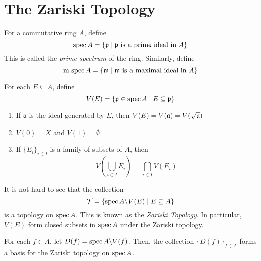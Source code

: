 \section{The Zariski Topology}

\begin{definition}
    For a commutative ring $A$, define 
    \begin{equation*}
        \operatorname{spec} A = \{\mathfrak p\mid\mathfrak p\text{ is a prime ideal in }A\}
    \end{equation*}
    This is called the \textit{prime spectrum} of the ring. Similarly, define 
    \begin{equation*}
        \operatorname{m-spec} A = \{\mathfrak m\mid\mathfrak m\text{ is a maximal ideal in } A\}
    \end{equation*}
\end{definition}

For each $E\subseteq A$, define 
\begin{equation*}
    V(E) = \{\mathfrak p\in\operatorname{spec} A\mid E\subseteq\mathfrak p\}
\end{equation*}

\begin{proposition}
\begin{enumerate}[label=(\alph*)]
    \item If $\mathfrak a$ is the ideal generated by $E$, then $V(E) = V(\mathfrak a) = V(\sqrt{\mathfrak a})$
    \item $V(0) = X$ and $V(1) = \emptyset$ 
    \item If $\{E_i\}_{i\in I}$ is a family of subsets of $A$, then 
    \begin{equation*}
        V\left(\bigcup_{i\in I}E_i\right) = \bigcap_{i\in I}V(E_i)
    \end{equation*}
\end{enumerate}
\end{proposition}

It is not hard to see that the collection 
\begin{equation*}
    \mathcal T = \{\operatorname{spec} A\backslash V(E)\mid E\subseteq A\}
\end{equation*}
is a topology on $\operatorname{spec} A$. This is known as the \textit{Zariski Topology}. In particular, $V(E)$ form closed subsets in $\operatorname{spec} A$ under the Zariski topology. 

\begin{proposition}
    For each $f\in A$, let $D(f) = \operatorname{spec} A\backslash V(f)$. Then, the collection $\{D(f)\}_{f\in A}$ forms a basis for the Zariski topology on $\operatorname{spec} A$.
\end{proposition}

